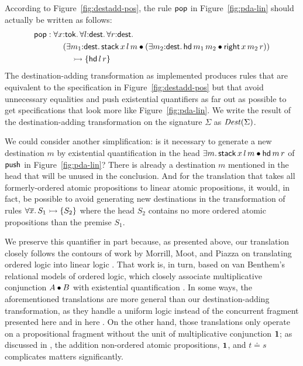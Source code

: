 According to Figure~\ref{fig:destadd-pos}, the rule 
${\sf pop}$ in Figure~\ref{fig:pda-lin} should actually be written as
follows:
\begin{align*} 
  {\sf pop} & : 
  \forall x{:}{\sf tok}.\,
  \forall l{:}{\sf dest}.\,
  \forall r{:}{\sf dest}.\,
  \\
  & \qquad (\exists m_1{:}{\sf dest}.\, {\sf stack}\,x\,l\,m \mathbin{\bullet}
   (\exists m_2{:}{\sf dest}.\, {\sf hd}\,m_1\,m_2 \mathbin{\bullet}
     {\sf right}\,x\,m_2\,r))
  \\ 
  & \qquad\quad \rightarrowtail
  \{ 
    {\sf hd}\,l\,r
  \}
\end{align*}
The destination-adding transformation as
implemented produces rules that are
equivalent to the specification in Figure~\ref{fig:destadd-pos}
but that avoid unnecessary equalities and push existential quantifiers
as far out as possible to get specifications that look more like
Figure~\ref{fig:pda-lin}. We write the result of the destination-adding
transformation on the signature $\Sigma$ as ${\it Dest}(\Sigma)$. 

We could consider another simplification: is it necessary to generate
a new destination $m$ by existential quantification in the head
$\exists m.\,{\sf stack}\,x\,l\,m \mathbin{\bullet} {\sf hd}\,m\,r$ of ${\sf
  push}$ in Figure~\ref{fig:pda-lin}? There is already a destination
$m$ mentioned in the head that will be unused in the conclusion.  And
for the translation that takes all formerly-ordered atomic
propositions to linear atomic propositions, it would, in fact, be
possible to avoid generating new destinations in the transformation of
rules $\forall \overline{x}.\,S_1 \rightarrowtail \{ S_2 \}$ where the head
$S_2$ contains no more ordered atomic propositions than the premise
$S_1$. 

We preserve this quantifier in part because, as presented above, our
translation closely follows the contours of work by Morrill, Moot, and
Piazza on translating ordered logic into linear logic
\cite{morrill95higher,moot01linguistic}. That work is, in turn, based
on van Benthem's relational models of ordered logic, which closely
associate multiplicative conjunction $A \mathbin{\bullet} B$ with existential
quantification \cite{vanbenthem91relational}. In some ways, the
aforementioned translations are more general than our
destination-adding transformation, as they handle a uniform logic
instead of the concurrent fragment presented here and in here
\cite{simmons11logical}. On the other hand, those translations only
operate on a propositional fragment without the unit of multiplicative
conjunction $\mathbf{1}$; as discussed in \cite[p.~57]{simmons11logical},
the addition non-ordered atomic propositions, $\mathbf{1}$, and $t \doteq s$
complicates matters significantly. 

